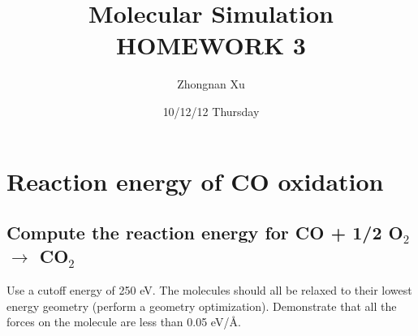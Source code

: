 \documentclass[11pt]{article}
\title{Molecular Simulation HOMEWORK 3}
\author{Zhongnan Xu}
\date{10/12/12 Thursday}
\begin{document}
\maketitle

\setcounter{tocdepth}{3}
\tableofcontents
\vspace*{1cm}


\section{Reaction energy of CO oxidation}
\label{sec-1}
\subsection{Compute the reaction energy for CO + 1/2 O$_{2}$ $\rightarrow$ CO$_{2}$}
\label{sec-1-1}
\label{rxn-energy}

Use a cutoff energy of 250 eV. The molecules should all be relaxed to their lowest energy geometry (perform a geometry optimization). Demonstrate that all the forces on the molecule are less than 0.05 eV/\AA{}.
\end{document}
